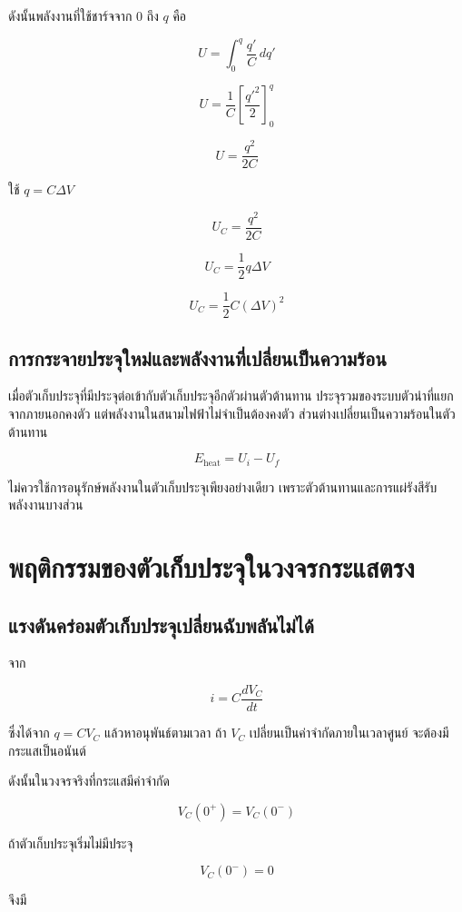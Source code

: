 ดังนั้นพลังงานที่ใช้ชาร์จจาก $0$ ถึง $q$ คือ

\[
U=\int_0^q\frac{q'}{C}\,dq'
\]

\[
U=\frac{1}{C}\left[\frac{q'^2}{2}\right]_0^q
\]

\[
U=\frac{q^2}{2C}
\]

ใช้ $q=C\Delta V$

\begin{tcolorbox}[title={พลังงานในตัวเก็บประจุ}]
\[
\boxed{U_C=\frac{q^2}{2C}}
\]

\[
\boxed{U_C=\frac{1}{2}q\Delta V}
\]

\[
\boxed{U_C=\frac{1}{2}C(\Delta V)^2}
\]
\end{tcolorbox}

\subsection{การกระจายประจุใหม่และพลังงานที่เปลี่ยนเป็นความร้อน}

เมื่อตัวเก็บประจุที่มีประจุต่อเข้ากับตัวเก็บประจุอีกตัวผ่านตัวต้านทาน ประจุรวมของระบบตัวนำที่แยกจากภายนอกคงตัว แต่พลังงานในสนามไฟฟ้าไม่จำเป็นต้องคงตัว ส่วนต่างเปลี่ยนเป็นความร้อนในตัวต้านทาน

\[
E_{\text{heat}}=U_i-U_f
\]

ไม่ควรใช้การอนุรักษ์พลังงานในตัวเก็บประจุเพียงอย่างเดียว เพราะตัวต้านทานและการแผ่รังสีรับพลังงานบางส่วน

\section{พฤติกรรมของตัวเก็บประจุในวงจรกระแสตรง}

\subsection{แรงดันคร่อมตัวเก็บประจุเปลี่ยนฉับพลันไม่ได้}

จาก

\[
i=C\frac{dV_C}{dt}
\]

ซึ่งได้จาก $q=CV_C$ แล้วหาอนุพันธ์ตามเวลา ถ้า $V_C$ เปลี่ยนเป็นค่าจำกัดภายในเวลาศูนย์ จะต้องมีกระแสเป็นอนันต์

ดังนั้นในวงจรจริงที่กระแสมีค่าจำกัด

\[
\boxed{V_C(0^+)=V_C(0^-)}
\]

ถ้าตัวเก็บประจุเริ่มไม่มีประจุ

\[
V_C(0^-)=0
\]

จึงมี

